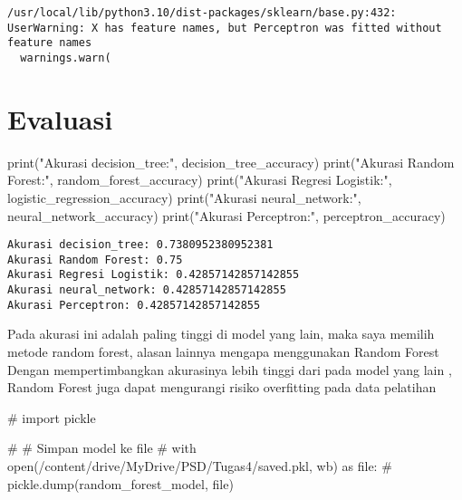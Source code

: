 \documentclass[
  letterpaper,
]{krantz}
\makeatletter
\newenvironment{Shaded}{\begin{snugshade}}{\end{snugshade}}
\newcommand{\BuiltInTok}[1]{\textcolor[rgb]{0.00,0.23,0.31}{#1}}
\newcommand{\CommentTok}[1]{\textcolor[rgb]{0.37,0.37,0.37}{#1}}
\newcommand{\NormalTok}[1]{\textcolor[rgb]{0.00,0.23,0.31}{#1}}
\newcommand{\StringTok}[1]{\textcolor[rgb]{0.13,0.47,0.30}{#1}}
\newenvironment{kframe}{%
\medskip{}
\setlength{\fboxsep}{.8em}
 \def\at@end@of@kframe{}%
 \ifinner\ifhmode%
  \def\at@end@of@kframe{\end{minipage}}%
  \begin{minipage}{\columnwidth}%
 \fi\fi%
 \def\FrameCommand##1{\hskip\@totalleftmargin \hskip-\fboxsep
 \colorbox{shadecolor}{##1}\hskip-\fboxsep
     \hskip-\linewidth \hskip-\@totalleftmargin \hskip\columnwidth}%
 \MakeFramed {\advance\hsize-\width
   \@totalleftmargin\z@ \linewidth\hsize
   \@setminipage}}%
 {\par\unskip\endMakeFramed%
 \at@end@of@kframe}
\renewenvironment{Shaded}{\begin{kframe}}{\end{kframe}}
\makeatother
\begin{document}
\begin{verbatim}
/usr/local/lib/python3.10/dist-packages/sklearn/base.py:432: UserWarning: X has feature names, but Perceptron was fitted without feature names
  warnings.warn(
\end{verbatim}


\hypertarget{evaluasi-1}{%
\chapter{Evaluasi}\label{evaluasi-1}}

\begin{Shaded}
\begin{Highlighting}[]
\BuiltInTok{print}\NormalTok{(}\StringTok{"Akurasi decision\_tree:"}\NormalTok{, decision\_tree\_accuracy)}
\BuiltInTok{print}\NormalTok{(}\StringTok{"Akurasi Random Forest:"}\NormalTok{, random\_forest\_accuracy)}
\BuiltInTok{print}\NormalTok{(}\StringTok{"Akurasi Regresi Logistik:"}\NormalTok{, logistic\_regression\_accuracy)}
\BuiltInTok{print}\NormalTok{(}\StringTok{"Akurasi neural\_network:"}\NormalTok{, neural\_network\_accuracy)}
\BuiltInTok{print}\NormalTok{(}\StringTok{"Akurasi Perceptron:"}\NormalTok{, perceptron\_accuracy)}
\end{Highlighting}
\end{Shaded}

\begin{verbatim}
Akurasi decision_tree: 0.7380952380952381
Akurasi Random Forest: 0.75
Akurasi Regresi Logistik: 0.42857142857142855
Akurasi neural_network: 0.42857142857142855
Akurasi Perceptron: 0.42857142857142855
\end{verbatim}

Pada akurasi ini adalah paling tinggi di model yang lain, maka saya
memilih metode random forest, alasan lainnya mengapa menggunakan Random
Forest Dengan mempertimbangkan akurasinya lebih tinggi dari pada model
yang lain , Random Forest juga dapat mengurangi risiko overfitting pada
data pelatihan

\begin{Shaded}
\begin{Highlighting}[]
\CommentTok{\# import pickle}

\CommentTok{\# \# Simpan model ke file}
\CommentTok{\# with open(\textquotesingle{}/content/drive/MyDrive/PSD/Tugas4/saved.pkl\textquotesingle{}, \textquotesingle{}wb\textquotesingle{}) as file:}
\CommentTok{\#     pickle.dump(random\_forest\_model, file)}
\end{Highlighting}
\end{Shaded}
\end{document}
